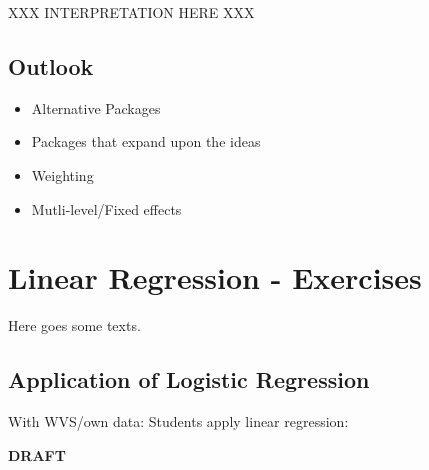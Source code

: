 \documentclass[
]{book}
\providecommand{\tightlist}{%
  \setlength{\itemsep}{0pt}\setlength{\parskip}{0pt}}
\begin{document}
XXX INTERPRETATION HERE XXX

\hypertarget{outlook}{%
\section{Outlook}\label{outlook}}

\begin{itemize}
\tightlist
\item
  Alternative Packages
\item
  Packages that expand upon the ideas
\item
  Weighting
\item
  Mutli-level/Fixed effects
\end{itemize}

\hypertarget{lin-e}{%
\chapter{Linear Regression - Exercises}\label{lin-e}}

Here goes some texts.

\hypertarget{application-of-logistic-regression}{%
\section{Application of Logistic Regression}\label{application-of-logistic-regression}}

With WVS/own data: Students apply linear regression:

\textbf{DRAFT}
\end{document}
